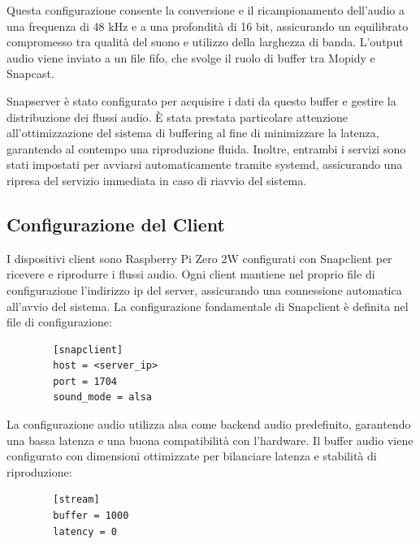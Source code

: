 Questa configurazione consente la conversione e il ricampionamento dell'audio a una frequenza di 48 kHz e a una profondità di 16 bit, assicurando un equilibrato compromesso tra qualità del suono e utilizzo della larghezza di banda. L'output audio viene inviato a un file \gls{fifo}, che svolge il ruolo di buffer tra Mopidy e Snapcast.

Snapserver è stato configurato per acquisire i dati da questo buffer e gestire la distribuzione dei flussi audio. È stata prestata particolare attenzione all'ottimizzazione del sistema di buffering al fine di minimizzare la latenza, garantendo al contempo una riproduzione fluida. Inoltre, entrambi i servizi sono stati impostati per avviarsi automaticamente tramite systemd, assicurando una ripresa del servizio immediata in caso di riavvio del sistema.

\subsection{Configurazione del Client}

I dispositivi client sono Raspberry Pi Zero 2W configurati con Snapclient per ricevere e riprodurre i flussi audio. Ogni client mantiene nel proprio file di configurazione l'indirizzo \gls{ip} del server, assicurando una connessione automatica all'avvio del sistema. La configurazione fondamentale di Snapclient è definita nel file di configurazione:

\begin{table}[H]
    \centering
    \begin{minipage}{0.5\textwidth} 
      \begin{verbatim}
        [snapclient]
        host = <server_ip>
        port = 1704
        sound_mode = alsa
      \end{verbatim}
    \end{minipage}
    \caption{Esempio di configurazione base di Snapclient.}
    \label{tab:snapclient_config}
\end{table}

La configurazione audio utilizza \gls{alsa} come backend audio predefinito, garantendo una bassa latenza e una buona compatibilità con l'hardware. Il buffer audio viene configurato con dimensioni ottimizzate per bilanciare latenza e stabilità di riproduzione:

\begin{table}[H]
    \centering
    \begin{minipage}{0.4\textwidth} 
      \begin{verbatim}
        [stream]
        buffer = 1000
        latency = 0
      \end{verbatim}
    \end{minipage}
    \caption{Configurazione del buffer audio di Snapclient.}
    \label{tab:snapclient_buffer}
  \end{table}

